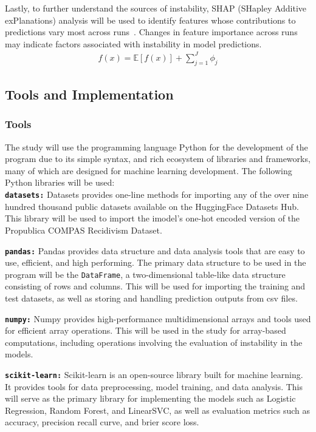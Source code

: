 \documentclass[12pt]{article}
\begin{document}
Lastly, to further understand the sources of instability, SHAP (SHapley Additive exPlanations) analysis will be used to identify features whose contributions to predictions vary most across runs~\cite{ponce2024practical}. Changes in feature importance across runs may indicate factors associated with instability in model predictions.
\begin{align}
  f(x) = \mathbb{E}[f(x)] + \sum_{j=1}^{J} \phi_j
\end{align}

\subsection{Tools and Implementation} 
\tab%
\subsubsection{Tools}
The study will use the programming language Python for the development of the program due to its simple syntax, and rich ecosystem of libraries and frameworks, many of which are designed for machine learning development. The following Python libraries will be used: \\

\textbf{\texttt{datasets:}} Datasets provides one-line methods for importing any of the over nine hundred thousand public datasets available on the HuggingFace Datasets Hub. This library will be used to import the imodel's one-hot encoded version of the Propublica COMPAS Recidivism Dataset.

\textbf{\texttt{pandas:}} Pandas provides data structure and data analysis tools that are easy to use, efficient, and high performing. The primary data structure to be used in the program will be the \texttt{DataFrame}, a two-dimensional table-like data structure consisting of rows and columns. This will be used for importing the training and test datasets, as well as storing and handling prediction outputs from csv files.

\textbf{\texttt{numpy:}} Numpy provides high-performance multidimensional arrays and tools used for efficient array operations. This will be used in the study for array-based computations, including operations involving the evaluation of instability in the models.

\textbf{\texttt{scikit-learn:}} Scikit-learn is an open-source library built for machine learning. It provides tools for data preprocessing, model training, and data analysis. This will serve as the primary library for implementing the models such as Logistic Regression, Random Forest, and LinearSVC, as well as evaluation metrics such as accuracy, precision recall curve, and brier score loss.
\end{document}
